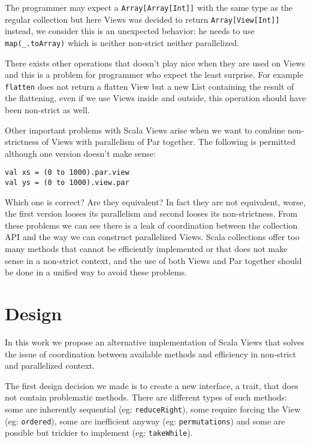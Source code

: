 \documentclass[a4paper,12pt,twocolumn]{article}
\begin{document}
The programmer may expect a \verb|Array[Array[Int]]| with the same type as the regular collection but here Views was decided to return \verb|Array[View[Int]]| instead, we consider this is an unexpected behavior: he needs to use \verb|map(_.toArray)| which is neither non-strict neither parallelized.

There exists other operations that doesn't play nice when they are used on Views and this is a problem for programmer who expect the least surprise.
For example \verb|flatten| does not return a flatten View but a new List containing the result of the flattening, even if we use Views inside and outside, this operation should have been non-strict as well.

Other important problems with Scala Views arise when we want to combine non-strictness of Views with parallelism of Par together.
The following is permitted although one version doesn't make sense:

\begin{lstlisting}
val xs = (0 to 1000).par.view
val ys = (0 to 1000).view.par
\end{lstlisting}

Which one is correct? Are they equivalent? In fact they are not equivalent, worse, the first version looses its parallelism and second looses its non-strictness.
From these problems we can see there is a leak of coordination between the collection API and the way we can construct parallelized Views.
Scala collections offer too many methods that cannot be efficiently implemented or that does not make sense in a non-strict context, and the use of both Views and Par together should be done in a unified way to avoid these problems.


\section{Design}
In this work we propose an alternative implementation of Scala Views that solves the issue of coordination between available methods and efficiency in non-strict and parallelized context.

The first design decision we made is to create a new interface, a trait, that does not contain problematic methods.
There are different types of such methods: some are inherently sequential (eg: \verb|reduceRight|), some require forcing the View (eg: \verb|ordered|), some are inefficient anyway (eg: \verb|permutations|) and some are possible but trickier to implement (eg: \verb|takeWhile|).
\end{document}
